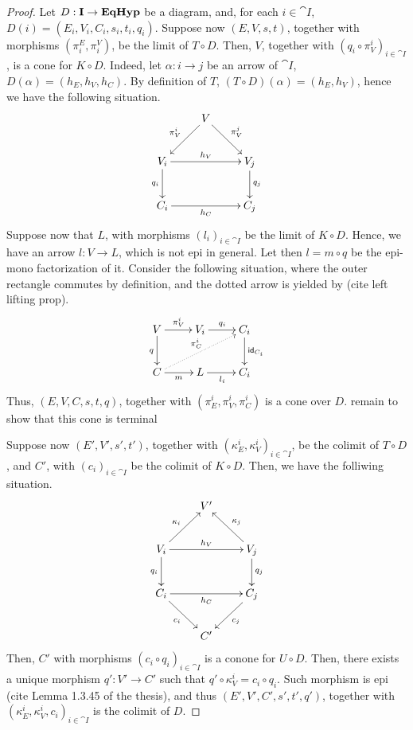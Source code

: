 \begin{proof}
	Let $D: \mathbf{I}\to \textbf{\textup{EqHyp}}$ be a diagram, and, for each $i \in \cat{I}$, $D(i) = (E_i, V_i, C_i, s_i, t_i, q_i)$.
	Suppose now $(E, V, s, t)$, together with morphisms $(\pi_i^E, \pi_i^V)$, be the limit of $T \circ D$.
	Then, $V$, together with $(q_i\circ \pi_V^i)_{i\in \cat I}$, is a cone for $K \circ D$. Indeed, let $\alpha: i \to j$ be an arrow of $\cat I$, $D(\alpha) = (h_E,h_V, h_C)$.
	By definition of $T$, $(T \circ D)(\alpha) = (h_E, h_V)$, hence we have the following situation.
	\[\xymatrix{
		& V \ar[dl]_{\pi_V^i} \ar[dr]^{\pi_V^j} & \\V_i\ar[rr]^{h_V}\ar[d]_{q_i}&&V_j\ar[d]^{q_j}\\C_i\ar[rr]_{h_C}&&C_j
	}\]
	Suppose now that $L$, with morphisms $(l_i)_{i\in \cat I}$ be the limit of $K\circ D$. Hence, we have an arrow $l:V \to L$, which is not epi in general.
	Let then $l = m \circ q$ be the epi-mono factorization of it. Consider the following situation, where the outer rectangle commutes by definition, and the dotted arrow is yielded by ({\color{red}cite left lifting prop}).
	\[\xymatrix{
			V\ar[r]^{\pi_V^i}\ar[d]_{q}&V_i\ar[r]^{q_i}&C_i\ar[d]^{\id{C_i}}\\C\ar[r]_{m}\ar@{.>}[urr]^{\pi_C^i}&L\ar[r]_{l_i}&{C_i}
	}\]
	Thus, $(E, V, C, s, t, q)$, together with $(\pi_E^i, \pi_V^i, \pi_C^i)$ is a cone over $D$. {\color{red} remain to show that this cone is terminal}
	
	Suppose now $(E', V', s', t')$, together with $(\kappa_E^i, \kappa_V^i)_{i \in \cat I}$, be the colimit of $T \circ D$, and $C'$, with $(c_i)_{i \in \cat I}$ be the colimit of $K \circ D$.
	Then, we have the folliwing situation.
	\[\xymatrix{
								  &  {V'} &                             \\
		V_i \ar[ur]^{\kappa_i} \ar[rr]^{h_V} \ar[d]_{q_i} && V_j \ar[ul]_{\kappa_j} \ar[d]^{q_j}\\
		C_i \ar[dr]_{c_i}      \ar[rr]_{h_C}              &&C_j  \ar[dl]^{c_j}                  \\
								  &  {C'} &
	}\]
	Then, $C'$ with morphisms $(c_i \circ q_i)_{i\in \cat I}$ is a conone for $U \circ D$. Then, there exists a unique morphism $q': V' \to C'$ such that $q'\circ \kappa_V^i = c_i\circ q_i$.
	Such morphism is epi ({\color{red}cite Lemma 1.3.45 of the thesis}), and thus $(E', V', C', s', t', q')$, together with $(\kappa_E^i, \kappa_V^i, c_i)_{i\in \cat I}$ is the colimit of $D$.
	
\end{proof}


